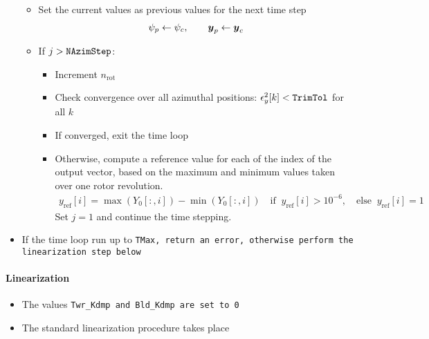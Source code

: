 \documentclass[11pt]{article}
\begin{document}
\begin{itemize}
\begin{itemize}
            \item Set the current values as previous values for the next time step
                \begin{align}
                   \psi_p \leftarrow \psi_c
                   ,\qquad
                   \v{y}_p \leftarrow \v{y}_c
                \end{align}

            \item If $j>\tt{NAzimStep}$: 
                    \begin{itemize}
                        \item Increment $n_\text{rot}$
                        \item Check convergence over all azimuthal positions: $\epsilon^2_y[k]<\tt{TrimTol}$ for all $k$
                        \item If converged, exit the time loop
                        \item Otherwise, compute a reference value for each of the index of the output vector, based on the maximum and minimum values taken over one rotor revolution.
                \begin{align}
                    y_{\text{ref}}[i] = \max(Y_0[:,i]) - \min(Y_0[:,i])
                \quad\text{if }\
                y_\text{ref}[i]>10^{-6}
                ,\quad\text{else }\
                y_\text{ref}[i]=1
                \label{eq:yref}
                \end{align}
                Set $j=1$ and continue the time stepping.
            \end{itemize}

    \end{itemize}
    \item If the time loop run up to \tt{TMax}, return an error, otherwise perform the linearization step below
\end{itemize}
\paragraph{Linearization}
\begin{itemize}
\item The values \tt{Twr\_Kdmp} and \tt{Bld\_Kdmp} are set to 0
\item The standard linearization procedure takes place
\end{itemize}
\end{document}
